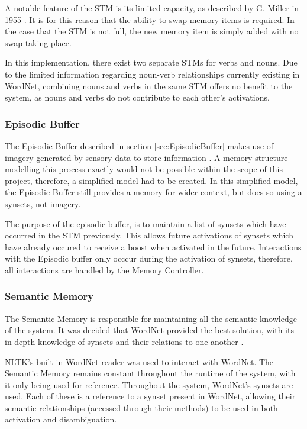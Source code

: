 \documentclass[]{article}
\begin{document}
A notable feature of the STM is its limited capacity, as described by G. Miller in 1955 \cite{SevenPlusMinusTwo}. It is for this reason that the ability to swap memory items is required. In the case that the STM is not full, the new memory item is simply added with no swap taking place.

In this implementation, there exist two separate STMs for verbs and nouns. Due to the limited information regarding noun-verb relationships currently existing in WordNet, combining nouns and verbs in the same STM offers no benefit to the system, as nouns and verbs do not contribute to each other's activations.

\subsubsection{Episodic Buffer}
\label{sec:ImplementedEpisodicBuffer}
The Episodic Buffer described in section \ref{sec:EpisodicBuffer} makes use of imagery generated by sensory data to store information \cite{BaddeleyEpisodicBuffer}. A memory structure modelling this process exactly would not be possible within the scope of this project, therefore, a simplified model had to be created. In this simplified model, the Episodic Buffer still provides a memory for wider context, but does so using a synsets, not imagery.

The purpose of the episodic buffer, is to maintain a list of synsets which have occurred in the STM previously. This allows future activations of synsets which have already occured to receive a boost when activated in the future. Interactions with the Episodic buffer only occcur during the activation of synsets, therefore, all interactions are handled by the Memory Controller.

\subsubsection{Semantic Memory}
\label{sec:ImplementedSemanticMemory}
The Semantic Memory is responsible for maintaining all the semantic knowledge of the system. It was decided that WordNet provided the best solution, with its in depth knowledge of synsets and their relations to one another \cite{WN2Nouns, WN4Verbs}.

NLTK's built in WordNet reader \cite{NLTK} was used to interact with WordNet. The Semantic Memory remains constant throughout the runtime of the system, with it only being used for reference. Throughout the system, WordNet's synsets are used. Each of these is a reference to a synset present in WordNet, allowing their semantic relationships (accessed through their methods) to be used in both activation and disambiguation. 
\end{document}
